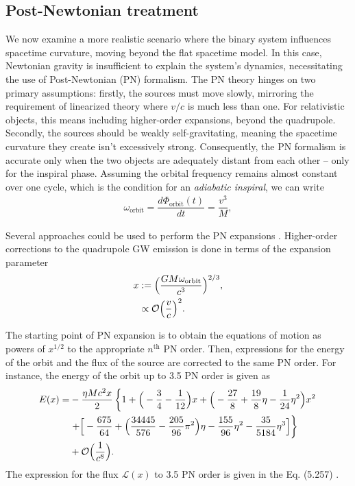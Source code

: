 \subsection{Post-Newtonian treatment}\label{sec:PN-formalism}

We now examine a more realistic scenario where the binary system influences spacetime curvature, moving beyond the flat spacetime model. In this case, Newtonian gravity is insufficient to explain the system's dynamics, necessitating the use of Post-Newtonian (PN) formalism. The PN theory hinges on two primary assumptions: firstly, the sources must move slowly, mirroring the requirement of linearized theory where $v/c$ is much less than one. For relativistic objects, this means including higher-order expansions, beyond the quadrupole. Secondly, the sources should be weakly self-gravitating, meaning the spacetime curvature they create isn't excessively strong. Consequently, the PN formalism is accurate only when the two objects are adequately distant from each other -- only for the inspiral phase.  Assuming the orbital frequency remains almost constant over one cycle, which is the condition for an \textit{adiabatic inspiral}, we can write
\begin{align}
    \omega_{\text{orbit}} = \dfrac{d\Phi_{\text{orbit}}(t)}{dt} = \dfrac{v^3}{M},
    \label{Eq:adiabatic-inspiral}
\end{align}

Several approaches could be used to perform the PN expansions \cite{Will:1996zj,Schafer:2018kuf,Blanchet:2013haa}. Higher-order corrections to the quadrupole GW emission is done in terms of the expansion parameter 
\begin{align}
    x &:= \Big(\dfrac{GM\omega_{\text{orbit}}}{c^3}\Big)^{2/3}, \label{Eq:PN-parameter} \\
    & \propto \mathcal{O}\Big( \dfrac{v}{c} \Big)^2.\notag
\end{align}

The starting point of PN expansion is to obtain the equations of motion as powers of $x^{1/2}$ to the appropriate $n^{\text{th}}$ PN order. Then, expressions for the energy of the orbit and the flux of the source are corrected to the same PN order. For instance, the energy of the orbit up to 3.5 PN order is given as \cite{Maggiore:2008aaa}
\begin{align}
    E(x) = & -\dfrac{\eta Mc^2x}{2}\left\{1 + \Big(-\dfrac{3}{4} - \dfrac{1}{12}\Big)x + \Big( -\dfrac{27}{8} + \dfrac{19}{8}\eta - \dfrac{1}{24}\eta^2 \Big)x^2 \right. \notag \\
    & \left. + \Big[ -\dfrac{675}{64} + \Big(\dfrac{34445}{576} - \dfrac{205}{96}\pi^2\Big)\eta -\dfrac{155}{96}\eta^2 -\dfrac{35}{5184}\eta^3 \Big] \right\} \notag \\
    & + \mathcal{O}\Big(\dfrac{1}{c^8}\Big).
    \label{Eq:energy-3.5PN}
\end{align}
The expression for the flux $\mathcal{L}(x)$ to 3.5 PN order is given in the Eq. (5.257) \cite{Maggiore:2008aaa}.



